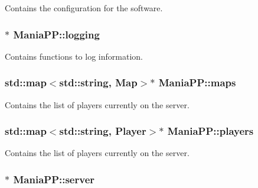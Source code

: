 Contains the configuration for the software. 

\hypertarget{classManiaPP_aa4cea090301bdf0bf652ad377e7b01c0}{
\subsubsection[{logging}]{$\ast$ Mania\-P\-P\-::logging\hspace{0.3cm}{\ttfamily [private]}}}\label{classManiaPP_aa4cea090301bdf0bf652ad377e7b01c0}


Contains functions to log information. 

\hypertarget{classManiaPP_a903ccf13c65b15c99595cb571214799d}{
\subsubsection[{maps}]{\setlength{\rightskip}{0pt plus 5cm}std\-::map$<$std\-::string, {\bf Map}$>$$\ast$ Mania\-P\-P\-::maps\hspace{0.3cm}{\ttfamily [private]}}}\label{classManiaPP_a903ccf13c65b15c99595cb571214799d}


Contains the list of players currently on the server. 

\hypertarget{classManiaPP_a45712ccfa91b20242b39cb1164d305d8}{
\subsubsection[{players}]{\setlength{\rightskip}{0pt plus 5cm}std\-::map$<$std\-::string, {\bf Player}$>$$\ast$ Mania\-P\-P\-::players\hspace{0.3cm}{\ttfamily [private]}}}\label{classManiaPP_a45712ccfa91b20242b39cb1164d305d8}


Contains the list of players currently on the server. 

\hypertarget{classManiaPP_ab81311d6901990cb99a7a30e0cbaab11}{
\subsubsection[{server}]{$\ast$ Mania\-P\-P\-::server\hspace{0.3cm}{\ttfamily [private]}}}\label{classManiaPP_ab81311d6901990cb99a7a30e0cbaab11}


